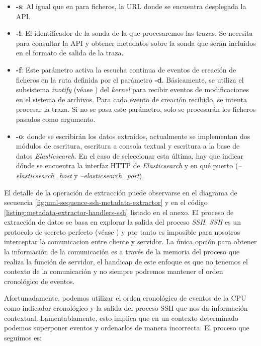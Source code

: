 \begin{itemize}
    \item \textbf{-s}: Al igual que en para ficheros, la URL donde se encuentra desplegada la API.
    \item \textbf{-i}: El identificador de la sonda de la que procesaremos las trazas. Se necesita para consultar la API y obtener metadatos
    sobre la sonda que serán incluidos en el formato de salida de la traza. 
    \item \textbf{-f}: Este parámetro activa la escucha continua de eventos de creación de ficheros en la ruta definida por el parámetro \textbf{-d}. Básicamente, 
    se utiliza el subsistema \emph{inotify} (véase \cite{wiki-inotify}) del \emph{kernel} para recibir eventos de modificaciones en el sistema de archivos. Para cada
    evento de creación recibido, se intenta procesar la traza. Si no se pasa este parámetro, solo se procesarán los ficheros pasados como argumento.
    \item \textbf{-o}: donde se escribirán los datos extraídos, actualmente se implementan dos módulos de escritura, escritura a consola textual
    y escritura a la base de datos \emph{Elasticsearch}. En el caso de seleccionar esta última, hay que indicar dónde se encuentra la interfaz HTTP de \emph{Elasticsearch} y
    en qué puerto (\emph{--elasticsearch\_host} y  \emph{--elasticsearch\_port}). 
\end{itemize}

El detalle de la operación de extracción puede observarse en el diagrama de secuencia \ref{fig:uml-sequence-ssh-metadata-extractor} y en el código \ref{listing:metadata-extractor-handlers-ssh} listado en el anexo. 
El proceso de extracción de datos se basa en explorar la salida del proceso \emph{SSH}. \emph{SSH} es un protocolo de secreto perfecto (véase \cite{wiki-fsecrecy}) y
por tanto es imposible para nosotros interceptar la comunicacion entre cliente y servidor. La única opción para obtener la información de la comunicación es a través
de la memoria del proceso que realiza la función de servidor, el handicap de este enfoque es que no tenemos el contexto de la comunicación y no siempre podremos
mantener el orden cronológico de eventos.

Afortunadamente, podemos utilizar el orden cronológico de eventos de la CPU como indicador cronológico y la salida del proceso SSH que nos da información contextual. Lamentablamente,
esto implica que en un contexto determinado podemos superponer eventos y ordenarlos de manera incorrecta. El proceso que seguimos es:


